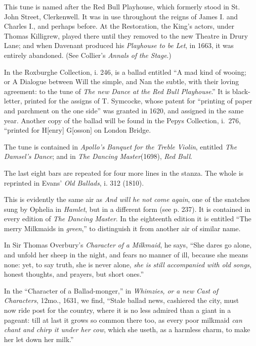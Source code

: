 This tune is named after the Red Bull Playhouse, which formerly stood in
St. John Street, Clerkenwell. It was in use throughout the reigns of James I.
and Charles I., and perhaps before. At the Restoration, the King’s actors, under
Thomas Killigrew, played there until they removed to the new Theatre in Drury
Lane; and when Davenant produced his \textit{Playhouse to be Let}, in 1663, it was
entirely abandoned. (See Collier’s \textit{Annals of the Stage}.)

In the Roxburghe Collection, i. 246, is a ballad entitled “A mad kind of
wooing; or A Dialogue between Will the simple, and Nan the subtle, with their
loving agreement: to the tune of \textit{The new Dance at the Red Bull Playhouse}.”
It is black-letter, printed for the assigns of T. Symcocke, whose patent for
“printing of paper and parchment on the one side” was granted in 1620, and
assigned in the same year. Another copy of the ballad will be found in the
Pepys Collection, i.~276, “printed for H[enry] G[osson] on London Bridge.

The tune is contained in \textit{Apollo’s Banquet for the Treble Violin}, entitled \textit{The
Damsel’s Dance}; and in \textit{The Dancing Master}(1698), \textit{Red Bull}.



The last eight bars are repeated for four more lines in the stanza. The whole
is reprinted in Evans’ \textit{Old Ballads}, i. 312 (1810).
\pagebreak


This is evidently the same air as \textit{And will he not come again}, one of the snatches
sung by Ophelia in \textit{Hamlet}, but in a different form (see p. 237). It is contained
in every edition of \textit{The Dancing Master}. In the eighteenth edition it is entitled
“The merry Milkmaids in \textit{green},” to distinguish it from another air of similar
name.

In Sir Thomas Overbury’s \textit{Character of a Milkmaid}, he says, “She dares go
alone, and unfold her sheep in the night, and fears no manner of ill, because she
means none: yet, to say truth, she is never alone, \textit{she is still accompanied with old
songs}, honest thoughts, and prayers, but short ones.”

In the “Character of a Ballad-monger,” in \textit{Whimzies, or a new Cast of
Characters}, 12mo., 1631, we find, “Stale ballad news, cashiered the city, must
now ride post for the country, where it is no less admired than a giant in a
pageant: till at last it grows so common there too, as every poor milkmaid\textit{ can
chant and chirp it under her cow}, which she useth, as a harmless charm, to make
her let down her milk.”

